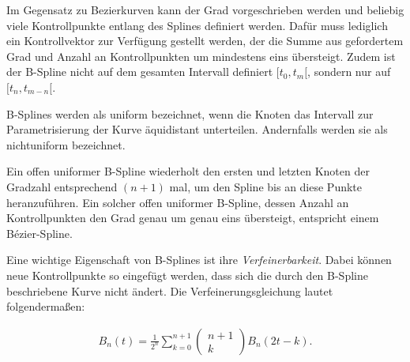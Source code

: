 \cite{kroemker:2008}

Im Gegensatz zu Bezierkurven kann der Grad vorgeschrieben werden und beliebig viele Kontrollpunkte entlang des Splines definiert werden.
Dafür muss lediglich ein Kontrollvektor zur Verfügung gestellt werden, der die Summe aus gefordertem Grad und Anzahl an Kontrollpunkten um mindestens eins übersteigt.
Zudem ist der B-Spline nicht auf dem gesamten Intervall definiert $[t_{0}, t_{m}[$, sondern nur auf $[t_{n}, t_{m - n}[$. \cite{kroemker:2008}

B-Splines werden als uniform bezeichnet, wenn die Knoten das Intervall zur Parametrisierung der Kurve äquidistant unterteilen.
Andernfalls werden sie als nichtuniform bezeichnet. \cite{kroemker:2008}

Ein offen uniformer B-Spline wiederholt den ersten und letzten Knoten der Gradzahl entsprechend $(n + 1)$ mal, um den Spline bis an diese Punkte heranzuführen.
Ein solcher offen uniformer B-Spline, dessen Anzahl an Kontrollpunkten den Grad genau um genau eins übersteigt, entspricht einem Bézier-Spline. \cite{kroemker:2008}

Eine wichtige Eigenschaft von B-Splines ist ihre \textit{Verfeinerbarkeit}.
Dabei können neue Kontrollpunkte so eingefügt werden, dass sich die durch den B-Spline beschriebene Kurve nicht ändert.
Die Verfeinerungsgleichung lautet folgendermaßen:

\begin{align*}
B_{n} (t) = \frac{1}{2^{n}} \sum_{k=0}^{n + 1} \left(
\begin{array}{c}
n + 1\\
k
\end{array}
\right) B_{n}(2t - k).
\end{align*}

\cite{kroemker:2008}
